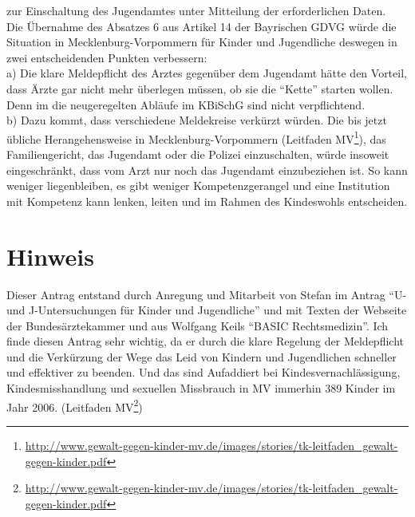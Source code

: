 zur Einschaltung des Jugendamtes unter Mitteilung der erforderlichen Daten.\\Die Übernahme des Absatzes 6 aus Artikel 14 der Bayrischen GDVG würde die Situation in Mecklenburg-Vorpommern für Kinder und Jugendliche deswegen in zwei entscheidenden Punkten verbessern:\\a) Die klare Meldepflicht des Arztes gegenüber dem Jugendamt hätte den Vorteil, dass Ärzte gar nicht mehr überlegen müssen, ob sie die ``Kette'' starten wollen. Denn im die neugeregelten Abläufe im KBiSchG sind nicht verpflichtend.\\b) Dazu kommt, dass verschiedene Meldekreise verkürzt würden. Die bis jetzt übliche Herangehensweise in Mecklenburg-Vorpommern (Leitfaden MV\footnote{\url{http://www.gewalt-gegen-kinder-mv.de/images/stories/tk-leitfaden\_gewalt-gegen-kinder.pdf}}), das Familiengericht, das Jugendamt oder die Polizei einzuschalten, würde insoweit eingeschränkt, dass vom Arzt nur noch das Jugendamt einzubeziehen ist. So kann weniger liegenbleiben, es gibt weniger Kompetenzgerangel und eine Institution mit Kompetenz kann lenken, leiten und im Rahmen des Kindeswohls entscheiden.

\section{Hinweis}

Dieser Antrag entstand durch Anregung und Mitarbeit von Stefan im Antrag ``U- und J-Untersuchungen für Kinder und Jugendliche'' und mit Texten der Webseite der Bundesärztekammer und aus Wolfgang Keils ``BASIC Rechtsmedizin''. Ich finde diesen Antrag sehr wichtig, da er durch die klare Regelung der Meldepflicht und die Verkürzung der Wege das Leid von Kindern und Jugendlichen schneller und effektiver zu beenden. Und das sind Aufaddiert bei Kindesvernachlässigung, Kindesmisshandlung und sexuellen Missbrauch in MV immerhin 389 Kinder im Jahr 2006. (Leitfaden MV\footnote{\url{http://www.gewalt-gegen-kinder-mv.de/images/stories/tk-leitfaden\_gewalt-gegen-kinder.pdf}})
